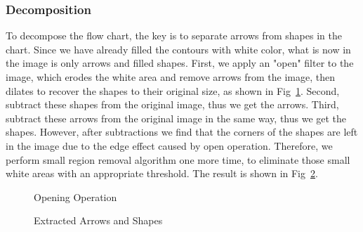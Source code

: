\documentclass[conference,twocolumn]{IEEEtran}
\begin{document}
\subsubsection{Decomposition}
To decompose the flow chart, the key is to separate arrows from shapes in the chart. Since we have already filled the contours with white color, what is now in the image is only arrows and filled shapes. First, we apply an "open" filter to the image, which erodes the white area and remove arrows from the image, then dilates to recover the shapes to their original size, as shown in Fig~\ref{fig:open}. Second, subtract these shapes from the original image, thus we get the arrows. Third, subtract these arrows from the original image in the same way, thus we get the shapes. However, after subtractions we find that the corners of the shapes are left in the image due to the edge effect caused by open operation. Therefore, we perform small region removal algorithm one more time, to eliminate those small white areas with an appropriate threshold. The result is shown in Fig~\ref{fig:extract}.

\begin{figure}[!htbp]
    \centering
    \caption{Opening Operation}
    \label{fig:open}
\end{figure}

\begin{figure}[!htbp]
    \centering
    \caption{Extracted Arrows and Shapes}
    \label{fig:extract}
\end{figure}
\end{document}
